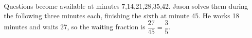 Questions become available at minutes 7,14,21,28,35,42. Jason solves them during the following three minutes each, finishing the sixth at minute 45. He works 18 minutes and waits 27, so the waiting fraction is $\dfrac{27}{45}=\boxed{\dfrac{3}{5}}$.
